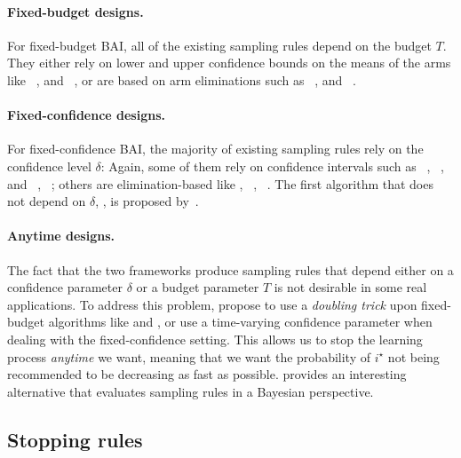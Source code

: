 \paragraph{Fixed-budget designs.}

For fixed-budget BAI, all of the existing sampling rules depend on the budget $T$. They either rely on lower and upper confidence bounds on the means of the arms like \UCBE~\citep{audibert2010budget}, and \UGapE~\citep{gabillon2012ugape}, or are based on arm eliminations such as \SR~\citep{audibert2010budget}, and \SHA~\citep{karnin2013sha}.

\paragraph{Fixed-confidence designs.}

For fixed-confidence BAI, the majority of existing sampling rules rely on the confidence level $\delta$: Again, some of them rely on confidence intervals such as \LUCB~\citep{kalyanakrishnan2012lucb}, \UGapE~\citep{gabillon2012ugape}, \KLLUCB and \KLRacing~\citep{kaufmann2013kl}, \LIL~\citep{jamieson2014lilucb}; others are elimination-based like \SE, \ME~\citep{even-dar2003confidence}, \EGE~\citep{karnin2013sha}. The first algorithm that does not depend on $\delta$, \Track, is proposed by~\cite{garivier2016tracknstop}.

\paragraph{Anytime designs.}

The fact that the two frameworks produce sampling rules that depend either on a confidence parameter $\delta$ or a budget parameter $T$ is not desirable in some real applications. To address this problem, \cite{jun2016atlucb} propose to use a \emph{doubling trick} upon fixed-budget algorithms like \SR and \SHA, or use a time-varying confidence parameter when dealing with the fixed-confidence setting. This allows us to stop the learning process \emph{anytime} we want, meaning that we want the probability of $i^{\star}$ not being recommended to be decreasing as fast as possible. \cite{russo2016ttts} provides an interesting alternative that evaluates sampling rules in a Bayesian perspective. %

\subsection{Stopping rules}\label{sec:mab.bai.stopping}


